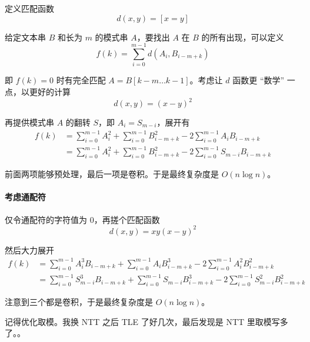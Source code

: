 定义匹配函数
\[ d(x,y) = [x = y] \]

给定文本串 $B$ 和长为 $m$ 的模式串 $A$，要找出 $A$ 在 $B$ 的所有出现，可以定义
\[ f(k) = \sum_{i=0}^{m-1} d(A_{i}, B_{i-m+k}) \]

即 $f(k) = 0$ 时有完全匹配 $A = B[k-m\ldots k-1]$。考虑让 $d$ 函数更 “数学” 一点，以更好的计算
\[ d(x,y) = (x - y)^2 \]

再提供模式串 $A$ 的翻转 $S$，即 $A_i = S_{m-i}$，展开有
\[ \begin{aligned}
f(k) &= \sum_{i=0}^{m-1}A_{i}^2 + \sum_{i=0}^{m-1}B_{i-m+k}^2 - 2\sum_{i=0}^{m-1} A_{i}B_{i-m+k}\\
&= \sum_{i=0}^{m-1}A_{i}^2 + \sum_{i=0}^{m-1}B_{i-m+k}^2 - 2\sum_{i=0}^{m-1} S_{m-i}B_{i-m+k}
\end{aligned} \]

前面两项能够预处理，最后一项是卷积。于是最终复杂度是 $O(n \log n)$。

\paragraph{考虑通配符}

仅令通配符的字符值为 $0$，再搓个匹配函数
\[ d(x,y) = xy(x-y)^2 \]

然后大力展开
\[ \begin{aligned}
f(k) &= \sum_{i=0}^{m-1}A_{i}^3B_{i-m+k} + \sum_{i=0}^{m-1}A_{i}B_{i-m+k}^3 - 2\sum_{i=0}^{m-1} A_{i}^2B_{i-m+k}^2\\
&= \sum_{i=0}^{m-1}S_{m-i}^3B_{i-m+k} + \sum_{i=0}^{m-1}S_{m-i}B_{i-m+k}^3 - 2\sum_{i=0}^{m-1} S_{m-i}^2B_{i-m+k}^2
\end{aligned} \]

注意到三个都是卷积，于是最终复杂度是 $O(n \log n)$。

记得优化取模。我换 NTT 之后 TLE 了好几次，最后发现是 NTT 里取模写多了。。

